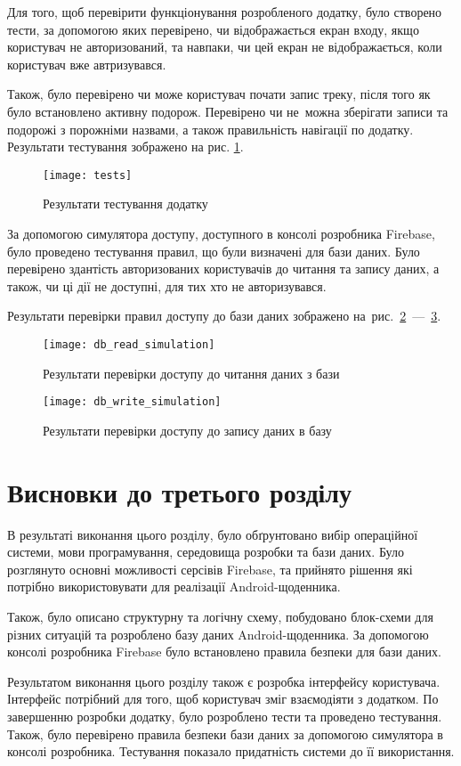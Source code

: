 \documentclass[../main.tex]{subfiles}
\begin{document}
Для того, щоб перевірити функціонування розробленого додатку, було створено тести, за допомогою яких перевірено, чи відображається екран входу, якщо користувач не авторизований, та навпаки, чи цей екран не відображається, коли користувач вже автризувався. 

Також, було перевірено чи може користувач почати запис треку, після того як було встановлено активну подорож. Перевірено чи не~можна зберігати записи та подорожі з порожніми назвами, а також правильність навігації по додатку. Результати тестування зображено на рис. \ref{figure:test_results}.

\begin{figure}[H]
	\centering
	\texttt{[image: tests]}
	\caption{Результати тестування додатку}
	\label{figure:test_results}
\end{figure}

За допомогою симулятора доступу, доступного в консолі розробника Firebase, було проведено тестування правил, що були визначені для бази даних. Було перевірено здантість авторизованих користувачів до читання та запису даних, а також, чи ці дії не доступні, для тих хто не авторизувався. 

Результати перевірки правил доступу до бази даних зображено на~рис.~\ref{figure:db_read_simulation}~—~\ref{figure:db_write_simulation}.

\begin{figure}[H]
	\centering
	\texttt{[image: db\_read\_simulation]}
	\caption{Результати перевірки доступу до читання даних з бази}
	\label{figure:db_read_simulation}
\end{figure}

\begin{figure}[H]
	\centering
	\texttt{[image: db\_write\_simulation]}
	\caption{Результати перевірки доступу до запису даних в базу}
	\label{figure:db_write_simulation}
\end{figure}

\section{Висновки до третього розділу}

В результаті виконання цього розділу, було обґрунтовано вибір операційної системи, мови програмування, середовища розробки та бази даних. Було розглянуто основні можливості серсівів Firebase, та прийнято рішення які потрібно використовувати для реалізації Android-щоденника.

Також, було описано структурну та логічну схему, побудовано блок-схеми для різних ситуацій та розроблено базу даних Android-щоденника. За допомогою консолі розробника Firebase було встановлено правила безпеки для бази даних. 

Результатом виконання цього розділу також є розробка інтерфейсу користувача. Інтерфейс потрібний для того, щоб користувач зміг взаємодіяти з додатком. По завершенню розробки додатку, було розроблено тести та проведено тестування. Також, було перевірено правила безпеки бази даних за допомогою симулятора в консолі розробника. Тестування показало придатність системи до її використання.
	
\end{document}
